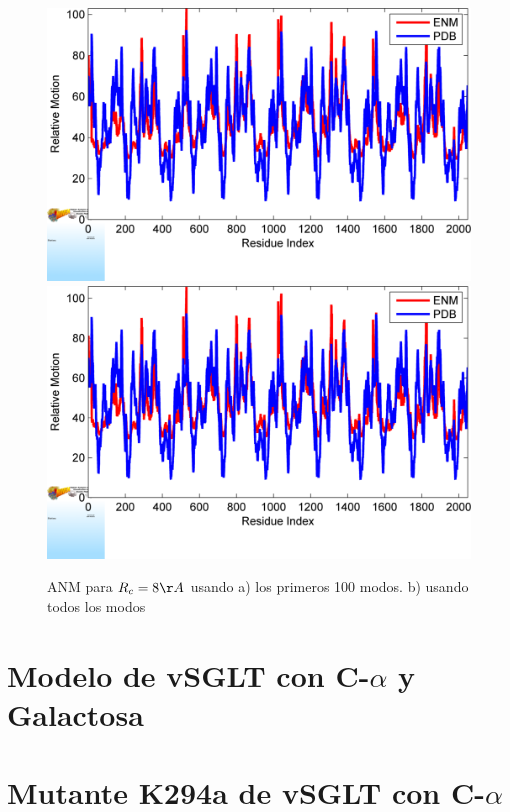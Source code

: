 \begin{figure}
 \centering
  \includegraphics[scale=0.3]{./Kap4/ANM/Ca/BF_plot_100.png}
 \includegraphics[scale=0.3]{./Kap4/ANM/Ca/BF_plot.png}
 \caption{ANM para $R_c=8\AA$ usando a) los primeros 100 modos. b) usando todos los modos}
\end{figure}
\section{Modelo de vSGLT con C-$\alpha$ y Galactosa}

\section{Mutante K294a de vSGLT con C-$\alpha$}